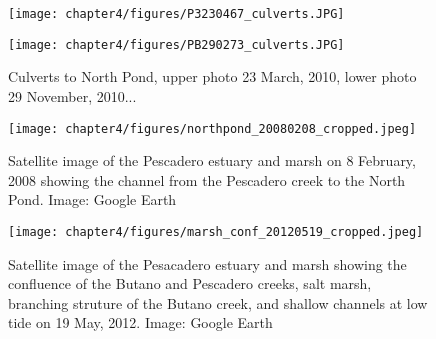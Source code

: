 \begin{figure}
\centering
	\texttt{[image: chapter4/figures/P3230467\_culverts.JPG]}

	\texttt{[image: chapter4/figures/PB290273\_culverts.JPG]}

\caption{Culverts to North Pond, upper photo 23 March, 2010, lower photo 29 November, 2010... } \label{fig:photoCulverts}
\end{figure}





\begin{figure}
\centering
	\texttt{[image: chapter4/figures/northpond\_20080208\_cropped.jpeg]}
	\caption{Satellite image of the Pescadero estuary and marsh on 8 February, 2008 showing the channel from the Pescadero creek to the North Pond. Image: Google Earth} \label{fig:geNP}
\end{figure}


\begin{figure}
\centering
	\texttt{[image: chapter4/figures/marsh\_conf\_20120519\_cropped.jpeg]}
	\caption{Satellite image of the Pesacadero estuary and marsh showing the confluence of the Butano and Pescadero creeks, salt marsh, branching struture of the Butano creek, and shallow channels at low tide on 19 May, 2012. Image: Google Earth} \label{fig:geMarsh}
\end{figure}
